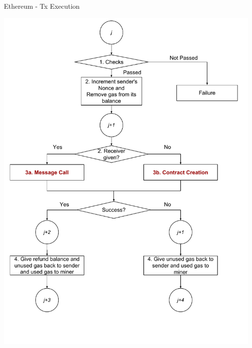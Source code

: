 \begin{frame}{Ethereum - Tx Execution~\cite{bib:yellow}}
\begin{center}
\includegraphics[height=0.85\textheight]{./img/transaction-execution}
\end{center}
\end{frame}



